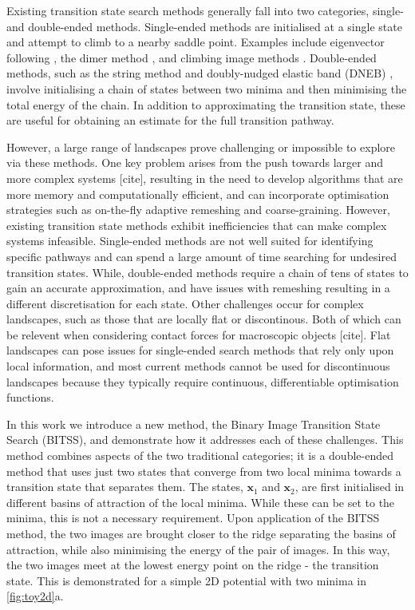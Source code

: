 \documentclass[aps,prl,twocolumn,groupedaddress]{revtex4}
\newcommand{\temp}[1]{{\leavevmode\color{red}#1}}
\begin{document}
\topic Existing transition state search methods generally fall into two categories, single- and double-ended methods.
Single-ended methods are initialised at a single state and attempt to climb to a nearby saddle point.
Examples include eigenvector following \cite{Cerjan1981}, the dimer method \cite{Heyden2005,Kastner2008}, and climbing image methods \cite{E2007,Ren2013}.
Double-ended methods, such as the string method \cite{E2002,E2007} and doubly-nudged elastic band (DNEB) \cite{Trygubenko2004}, involve initialising a chain of states between two minima and then minimising the total energy of the chain.
In addition to approximating the transition state, these are useful for obtaining an estimate for the full transition pathway.

\topic However, a large range of landscapes prove challenging or impossible to explore via these methods.
One key problem arises from the push towards larger and more complex systems \temp{[cite]}, resulting in the need to develop algorithms that are more memory and computationally efficient, and can incorporate optimisation strategies such as on-the-fly adaptive remeshing and coarse-graining.
However, existing transition state methods exhibit inefficiencies that can make complex systems infeasible.
Single-ended methods are not well suited for identifying specific pathways and can spend a large amount of time searching for undesired transition states.
While, double-ended methods require a chain of tens of states to gain an accurate approximation, and have issues with remeshing resulting in a different discretisation for each state.
Other challenges occur for complex landscapes, such as those that are locally flat or discontinous.
Both of which can be relevent when considering contact forces for macroscopic objects \temp{[cite]}.
Flat landscapes can pose issues for single-ended search methods that rely only upon local information, and most current methods cannot be used for discontinuous landscapes because they typically require continuous, differentiable optimisation functions.

\topic In this work we introduce a new method, the Binary Image Transition State Search (BITSS), and demonstrate how it addresses each of these challenges.
This method combines aspects of the two traditional categories; it is a double-ended method that uses just two states that converge from two local minima towards a transition state that separates them.
The states, $\bm{x}_1$ and $\bm{x}_2$, are first initialised in different basins of attraction of the local minima.
While these can be set to the minima, this is not a necessary requirement.
Upon application of the BITSS method, the two images are brought closer to the ridge separating the basins of attraction, while also minimising the energy of the pair of images.
In this way, the two images meet at the lowest energy point on the ridge - the transition state.
This is demonstrated for a simple 2D potential with two minima in \cref{fig:toy2d}a.
\end{document}
